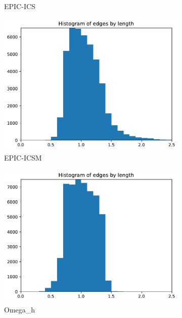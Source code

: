 \documentclass[3p,times,procedia,number]{elsarticle}
\begin{document}
\begin{figure}
\begin{subfigure}{.16\textwidth}
\caption{EPIC-ICS}
\end{subfigure}
\begin{subfigure}{.16\textwidth}
\centering
\includegraphics[width=\textwidth]{epic-icsm-cube-cylinder-linear-length.pdf}
\caption{EPIC-ICSM}
\end{subfigure}
\begin{subfigure}{.16\textwidth}
\centering
\includegraphics[width=\textwidth]{omega_h-cube-cylinder-linear-length.pdf}
\caption{Omega\_h}
\end{subfigure}
\begin{subfigure}{.16\textwidth}
\centering

\end{subfigure}
\end{figure}
\end{document}
